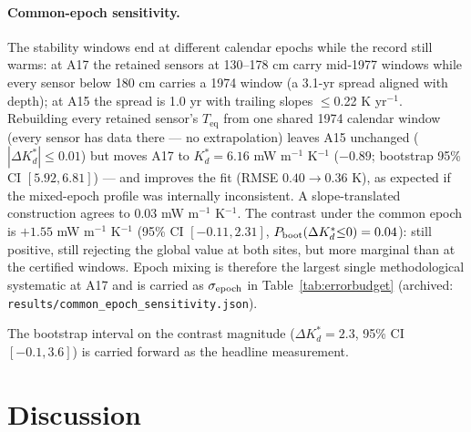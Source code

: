 \documentclass[11pt]{article}
\begin{document}
\paragraph*{Common-epoch sensitivity.}
The stability windows end at different calendar epochs while the
record still warms: at A17 the retained sensors at 130--178 cm carry
mid-1977 windows while every sensor below 180 cm carries a 1974 window
(a 3.1-yr spread aligned with depth); at A15 the spread is 1.0 yr with
trailing slopes $\le$0.22 K yr$^{-1}$. Rebuilding every retained
sensor's $T_\mathrm{eq}$ from one shared 1974 calendar window (every
sensor has data there --- no extrapolation) leaves A15 unchanged
($|\Delta K_d^{*}|\le 0.01$) but moves A17 to
$K_d^{*}=6.16$ mW m$^{-1}$ K$^{-1}$ ($-0.89$; bootstrap 95\% CI
$[5.92, 6.81]$) --- and improves the fit (RMSE
$0.40\rightarrow0.36$ K), as expected if the mixed-epoch profile was
internally inconsistent. A slope-translated construction agrees to
0.03 mW m$^{-1}$ K$^{-1}$. The contrast under the common epoch is
$+1.55$ mW m$^{-1}$ K$^{-1}$ (95\% CI $[-0.11, 2.31]$,
$P_{\rm boot}(\Delta K_d^{*}{\le}0)=0.04$): still positive, still
rejecting the global value at both sites, but more marginal than at the
certified windows. Epoch mixing is therefore the largest single
methodological systematic at A17 and is carried as $\sigma_{\rm epoch}$
in Table~\ref{tab:errorbudget}
(archived: \texttt{results/common\_epoch\_sensitivity.json}).

The bootstrap interval
on the contrast
magnitude ($\Delta
K_d^{*}=2.3$, 95\% CI $[-0.1,3.6]$) is carried forward
as the headline measurement.


\FloatBarrier
\section{Discussion}\label{sec:discussion}
\end{document}
